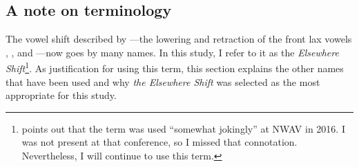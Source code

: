 \subsection{A note on terminology}
\label{sec:terminology}

The vowel shift described by \citet{hinton_etal_1987}---the lowering and retraction of the front lax vowels \bit, \dress, and \bat---now goes by many names. In this study, I refer to it as the \textit{Elsewhere Shift}\footnote{\citet[20]{strelluf_2019} points out that the term was used ``somewhat jokingly'' at NWAV in 2016. I was not present at that conference, so I missed that connotation. Nevertheless, I will continue to use this term.}. As justification for using this term, this section explains the other names that have been used and why \textit{the Elsewhere Shift} was selected as the most appropriate for this study.

